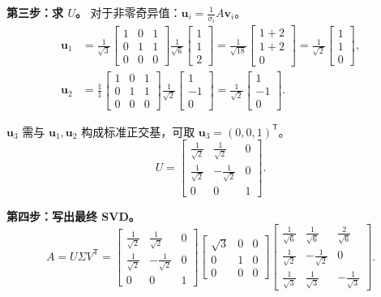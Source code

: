 \documentclass{article}
\begin{document}
\textbf{第三步：求 $U$。}
对于非零奇异值：$\bm{u}_i = \frac{1}{\sigma_i}A\bm{v}_i$。
\begin{align*}
\bm{u}_1 &= \frac{1}{\sqrt{3}}\begin{bmatrix}1 & 0 & 1\\0 & 1 & 1\\0 & 0 & 0\end{bmatrix}
\frac{1}{\sqrt{6}}\begin{bmatrix}1\\1\\2\end{bmatrix}
= \frac{1}{\sqrt{18}}\begin{bmatrix}1+2\\1+2\\0\end{bmatrix}
= \frac{1}{\sqrt{2}}\begin{bmatrix}1\\1\\0\end{bmatrix},\\[4pt]
\bm{u}_2 &= \frac{1}{1}\begin{bmatrix}1 & 0 & 1\\0 & 1 & 1\\0 & 0 & 0\end{bmatrix}
\frac{1}{\sqrt{2}}\begin{bmatrix}1\\-1\\0\end{bmatrix}
= \frac{1}{\sqrt{2}}\begin{bmatrix}1\\-1\\0\end{bmatrix}.
\end{align*}

$\bm{u}_3$ 需与 $\bm{u}_1,\bm{u}_2$ 构成标准正交基，可取 $\bm{u}_3=(0,0,1)^{\mathsf T}$。
\[
U = \begin{bmatrix}
\frac{1}{\sqrt{2}} & \frac{1}{\sqrt{2}} & 0\\[4pt]
\frac{1}{\sqrt{2}} & -\frac{1}{\sqrt{2}} & 0\\[4pt]
0 & 0 & 1
\end{bmatrix}.
\]

\textbf{第四步：写出最终 SVD。}
\[
A = U\Sigma V^{\mathsf T} = \begin{bmatrix}
\frac{1}{\sqrt{2}} & \frac{1}{\sqrt{2}} & 0\\[4pt]
\frac{1}{\sqrt{2}} & -\frac{1}{\sqrt{2}} & 0\\[4pt]
0 & 0 & 1
\end{bmatrix}
\begin{bmatrix}
\sqrt{3} & 0 & 0\\
0 & 1 & 0\\
0 & 0 & 0
\end{bmatrix}
\begin{bmatrix}
\frac{1}{\sqrt{6}} & \frac{1}{\sqrt{6}} & \frac{2}{\sqrt{6}}\\[4pt]
\frac{1}{\sqrt{2}} & -\frac{1}{\sqrt{2}} & 0\\[4pt]
\frac{1}{\sqrt{3}} & \frac{1}{\sqrt{3}} & -\frac{1}{\sqrt{3}}
\end{bmatrix}.
\]
\end{document}
